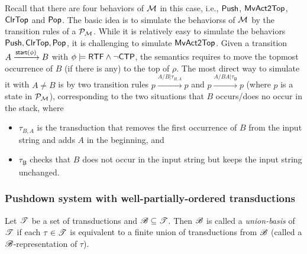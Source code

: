 {Recall that there are four behaviors of ${\mathcal{M} }$ in this case, i.e., $\mathsf{Push}$, $\mathsf{MvAct2Top}$, $\mathsf{ClrTop}$ and $\mathsf{Pop}$.
The basic idea is to simulate the behaviorss of ${\mathcal{M} }$ by the transition rules of a {\TrPDS} ${\mathcal{P} }_{{\mathcal{M} }}$. While it is relatively easy to simulate the behaviors $\mathsf{Push}, \mathsf{ClrTop}, \mathsf{Pop}$, %
it is challenging to simulate $\mathsf{MvAct2Top}$. Given a transition $A\xrightarrow{{\mathsf{start} }(\phi)}B$ with $\phi\models{\sf RTF}\wedge\neg{\sf CTP}$, the semantics requires to move the topmost occurrence of $B$ (if there is any) to the top of $\rho$. The most direct way to simulate it with $A \neq B$ is by two transition rules $p \xrightarrow{A / B | \tau_{B, A}} p$ and  $p \xrightarrow{A / BA | \tau_{\not B}} p$
(where $p$ is a state in ${\mathcal{P} }_{\mathcal{M} }$), corresponding to the two situations that $B$ occurs/does no occur in the stack, where 
\begin{itemize}
\item $\tau_{B, A}$ is the transduction that removes the first occurrence of $B$ from the input string and adds $A$ in the beginning, and
%
\item $\tau_{\not B}$ checks that $B$ does not occur in the input string but keeps the input string unchanged. 
\end{itemize}
}

\subsubsection{Pushdown system with well-partially-ordered transductions}\label{sec-wpotrpds}

\begin{definition}\label{def-ubasis}
Let ${\mathscr{T} }$ be a set of transductions and ${\mathscr{B} } \subseteq {\mathscr{T} }$. Then ${\mathscr{B} }$ is called a \emph{union-basis} of ${\mathscr{T} }$ if each $\tau \in {\mathscr{T} }$ is equivalent to a finite union of transductions from ${\mathscr{B} }$ (called a ${\mathscr{B} }$-representation of $\tau$). 
\end{definition}

